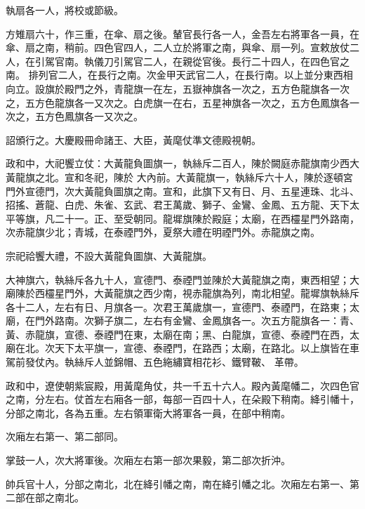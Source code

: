 \begin{pinyinscope}
 執扇各一人，將校或節級。



 方雉扇六十，作三重，在傘、扇之後。輦官長行各一人，金吾左右將軍各一員，在傘、扇之南，稍前。四色官四人，二人立於將軍之南，與傘、扇一列。宣敕放仗二人，在引駕官南。執儀刀引駕官二人，在親從官後。長行二十四人，在四色官之南。
 排列官二人，在長行之南。次金甲天武官二人，在長行南。以上並分東西相向立。設旗於殿門之外，青龍旗一在左，五嶽神旗各一次之，五方色龍旗各一次之，五方色龍旗各一又次之。白虎旗一在右，五星神旗各一次之，五方色鳳旗各一次之，五方色鳳旗各一又次之。



 詔頒行之。大慶殿冊命諸王、大臣，黃麾仗準文德殿視朝。



 政和中，大祀饗立仗：大黃龍負圖旗一，執絲斥二百人，陳於闕庭赤龍旗南少西大黃龍旗之北。宣和冬祀，陳於
 大內前。大黃龍旗一，執絲斥六十人，陳於逐頓宮門外宣德門，次大黃龍負圖旗之南。宣和，此旗下又有日、月、五星連珠、北斗、招搖、蒼龍、白虎、朱雀、玄武、君王萬歲、獅子、金鸞、金鳳、五方龍、天下太平等旗，凡二十一。正、至受朝同。龍墀旗陳於殿庭；太廟，在西欞星門外路南，次赤龍旗少北；青城，在泰禋門外，夏祭大禮在明禋門外。赤龍旗之南。



 宗祀祫饗大禮，不設大黃龍負圖旗、大黃龍旗。



 大神旗六，執絲斥各九十人，宣德門、泰禋門並陳於大黃龍旗之南，東西相望；大
 廟陳於西欞星門外，大黃龍旗之西少南，視赤龍旗為列，南北相望。龍墀旗執絲斥各十二人，左右有日、月旗各一。次君王萬歲旗一，宣德門、泰禋門，在路東；太廟，在門外路南。次獅子旗二，左右有金鸞、金鳳旗各一。次五方龍旗各一：青、黃、赤龍旗，宣德、泰禋門在東，太廟在南；黑、白龍旗，宣德、泰禋門在西，太廟在北。次天下太平旗一，宣德、泰禋門，在路西；太廟，在路北。以上旗皆在車駕前發仗內。執絲斥人並錦帽、五色絁繡寶相花衫、鐵臂鞁、
 革帶。



 政和中，遼使朝紫宸殿，用黃麾角仗，共一千五十六人。殿內黃麾幡二，次四色官之南，分左右。仗首左右廂各一部，每部一百四十人，在朵殿下稍南。絳引幡十，分部之南北，各為五重。左右領軍衛大將軍各一員，在部中稍南。



 次廂左右第一、第二部同。



 掌鼓一人，次大將軍後。次廂左右第一部次果毅，第二部次折沖。



 帥兵官十人，分部之南北，北在絳引幡之南，南在絳引幡之北。次廂左右第一、第二部在部之南北。




\end{pinyinscope}

